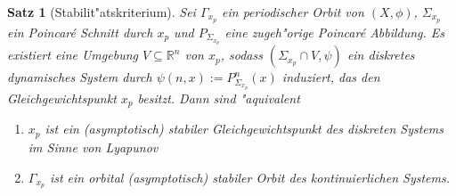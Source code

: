 \documentclass[a4paper, 13pt]{scrreprt}
\newtheorem{satz}{Satz}[section]
\theoremstyle{definition} \newtheorem{definition}{Definition}[section]
\newcommand{\RR}{\mathbb{R}}
\begin{document}
\begin{satz}[Stabilit"atskriterium]\label{stabilitatskriterium_periodische_orbits}
Sei $\Gamma_{x_p}$ ein periodischer Orbit von $(X, \phi)$, $\Sigma_{x_p}$ ein Poincar\'{e} Schnitt durch $x_p$ und $P_{\Sigma_{x_p}}$ eine zugeh"orige Poincar\'{e} Abbildung. Es existiert eine Umgebung $V\subseteq \RR^n$ von $x_p$, sodass $(\Sigma_{x_p}\cap V, \psi)$ ein diskretes dynamisches System durch $\psi(n, x) := P_{\Sigma_{x_p}}^n(x)$ induziert, das den Gleichgewichtspunkt $x_p$ besitzt. 
Dann sind "aquivalent
\begin{enumerate}
\item $x_p$ ist ein (asymptotisch) stabiler Gleichgewichtspunkt des diskreten Systems im Sinne von Lyapunov
\item $\Gamma_{x_p}$ ist ein orbital (asymptotisch) stabiler Orbit des kontinuierlichen Systems.
\end{enumerate}
\end{satz}
\end{document}
